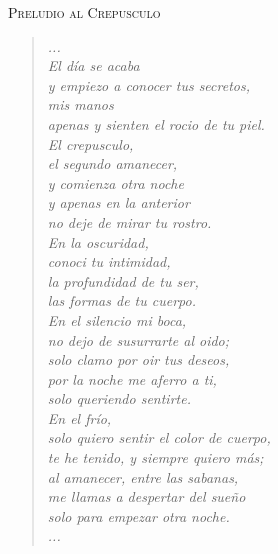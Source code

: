 \documentclass[12pt,babel]{book}
\begin{document}
	\begin{center}
		\textsc{ \Large Preludio al Crepusculo }
	\end{center}
	
	\begin{verse}
		\centering
			\textit{ 
				... \\
				El d\'ia se acaba \\
				y empiezo a conocer tus secretos, \\
				mis manos \\
				apenas y sienten el rocio de tu piel. \\ \bigskip
				El crepusculo, \\
				el segundo amanecer, \\
				y comienza otra noche \\
				y apenas en la anterior \\
				no deje de mirar tu rostro.\\ \bigskip
				En la oscuridad, \\
				conoci tu intimidad, \\
				la profundidad de tu ser, \\
				las formas de tu cuerpo. \\ \bigskip
				En el silencio mi boca, \\
				no dejo de susurrarte al oido; \\
				solo clamo por oir tus deseos, \\
				por la noche me aferro a ti, \\
				solo queriendo sentirte. \\ \bigskip
				En el fr\'io, \\
				solo quiero sentir el color de cuerpo, \\
				te he tenido, y siempre quiero m\'as; \\
				al amanecer, entre las sabanas, \\
				me llamas a despertar del sue\~no \\
				solo para empezar otra noche. \\ \bigskip
				...
			}
	\end{verse}
\end{document}
